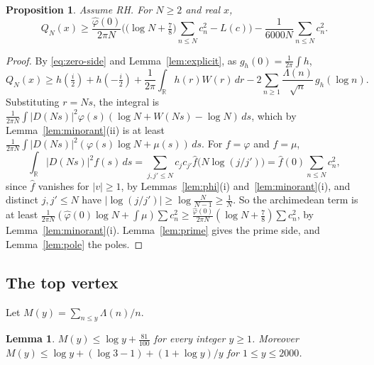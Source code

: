\documentclass[11pt]{article}
\newtheorem{proposition}[theorem]{Proposition}
\newtheorem{lemma}[theorem]{Lemma}
\theoremstyle{definition}
\begin{document}
\begin{proposition}\label{prop:form}
Assume RH. For $N \ge 2$ and real $x$,
\[
Q_N(x) \ge \frac{\hat\varphi(0)}{2\pi N}\Big(\big(\log N +
\tfrac78\big) \sum_{n \le N} c_n^2 - L(c)\Big) - \frac{1}{6000N}
\sum_{n \le N} c_n^2 .
\]
\end{proposition}

\begin{proof}
By \eqref{eq:zero-side} and Lemma~\ref{lem:explicit}, as $g_h(0) = \frac{1}{2\pi} \int h$,
\[
Q_N(x) \ge h(\tfrac i2) + h(-\tfrac i2) + \frac{1}{2\pi} \int_{\mathbb R} h(r) W(r)\,dr - 2 \sum_{n \ge 1}
\frac{\Lambda(n)}{\sqrt n}\, g_h(\log n).
\]
Substituting $r = Ns$, the integral is $\frac{1}{2\pi N} \int |D(Ns)|^2 \varphi(s)(\log N + W(Ns) - \log N)\,ds$,
which by Lemma~\ref{lem:minorant}(ii) is at least $\frac{1}{2\pi N} \int |D(Ns)|^2 (\varphi(s) \log N + \mu(s))\,ds$.
For $f = \varphi$ and $f = \mu$,
\[
\int_{\mathbb R} |D(Ns)|^2 f(s)\,ds = \sum_{j, j' \le N} c_j c_{j'} \hat f\big(N \log(j/j')\big) = \hat f(0) \sum_{n \le
N} c_n^2,
\]
since $\hat f$ vanishes for $|v| \ge 1$, by Lemmas~\ref{lem:phi}(i) and~\ref{lem:minorant}(i), and distinct $j, j' \le
N$ have $|\log(j/j')| \ge \log\frac{N}{N - 1} \ge \frac1N$. So the archimedean term is at least $\frac{1}{2\pi
N}(\hat\varphi(0) \log N + \int \mu) \sum c_n^2 \ge \frac{\hat\varphi(0)}{2\pi N}(\log N + \frac78) \sum c_n^2$, by
Lemma~\ref{lem:minorant}(i). Lemma~\ref{lem:prime} gives the prime side, and Lemma~\ref{lem:pole} the poles.
\end{proof}

\subsection{The top vertex}

Let $M(y) = \sum_{n \le y} \Lambda(n)/n$.

\begin{lemma}\label{lem:mertens}
$M(y) \le \log y + \frac{81}{100}$ for every integer $y \ge 1$. Moreover $M(y) \le \log y + (\log 3 - 1) + (1 + \log
y)/y$ for $1 \le y \le 2000$.
\end{lemma}
\end{document}
